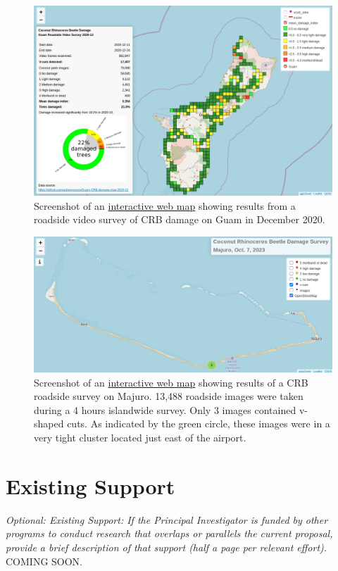 \documentclass[11pt,english,letterpaper]{scrartcl}
\begin{document}
\begin{figure}[H]
	\centering
	\includegraphics[width=0.8\linewidth]{images/crb-webmap-2020-12.png}
	\caption{Screenshot of an \href{https://aubreymoore.github.io/Guam-CRB-damage-map-2020-12/webmap/v1}{interactive web map} showing results from a roadside video survey of	CRB damage on Guam in December 2020.}
	\label{fig:guam02}
\end{figure}

\begin{figure}[H]
	\centering
	\includegraphics[width=\linewidth]{images/majuro-webmap}
	\caption{Screenshot of an \href{https://aubreymoore.github.io/Majuro-CRB-damage-map-1/webmap}{interactive web map} showing results of a CRB roadside survey on Majuro. 13,488 roadside images were taken during a 4 hours islandwide survey. Only 3 images contained v-shaped cuts. As indicated by the green circle, these images were in a very tight cluster located just east of the airport.}
	\label{fig:majuro-webmap}
\end{figure}

\clearpage
\section{Existing Support}

\textit{Optional: Existing Support: If the Principal Investigator is funded by other programs to conduct research that overlaps or parallels the current proposal, provide a brief description of that support (half a page per relevant effort).} \\

COMING SOON.
\end{document}
